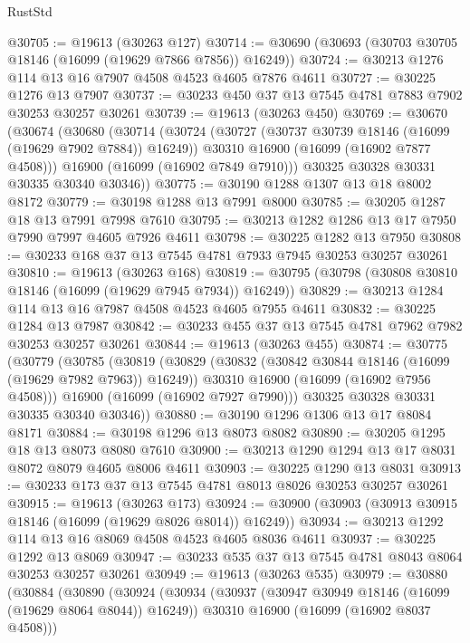 \begin{lexlean}{RustStd}
\begin{coremodule}
@30705 := @19613 (@30263 @127)
@30714 := @30690 (@30693 (@30703 @30705 @18146 (@16099 (@19629 @7866 @7856)) @16249))
@30724 := @30213 @1276 @114 @13 @16 @7907 @4508 @4523 @4605 @7876 @4611
@30727 := @30225 @1276 @13 @7907
@30737 := @30233 @450 @37 @13 @7545 @4781 @7883 @7902 @30253 @30257 @30261
@30739 := @19613 (@30263 @450)
@30769 := @30670
    (@30674
      (@30680
        (@30714
          (@30724
            (@30727 (@30737 @30739 @18146 (@16099 (@19629 @7902 @7884)) @16249))
            @30310
            @16900
            (@16099 (@16902 @7877 @4508)))
          @16900
          (@16099 (@16902 @7849 @7910)))
        @30325
        @30328
        @30331
        @30335
        @30340
        @30346))
@30775 := @30190 @1288 @1307 @13 @18 @8002 @8172
@30779 := @30198 @1288 @13 @7991 @8000
@30785 := @30205 @1287 @18 @13 @7991 @7998 @7610
@30795 := @30213 @1282 @1286 @13 @17 @7950 @7990 @7997 @4605 @7926 @4611
@30798 := @30225 @1282 @13 @7950
@30808 := @30233 @168 @37 @13 @7545 @4781 @7933 @7945 @30253 @30257 @30261
@30810 := @19613 (@30263 @168)
@30819 := @30795 (@30798 (@30808 @30810 @18146 (@16099 (@19629 @7945 @7934)) @16249))
@30829 := @30213 @1284 @114 @13 @16 @7987 @4508 @4523 @4605 @7955 @4611
@30832 := @30225 @1284 @13 @7987
@30842 := @30233 @455 @37 @13 @7545 @4781 @7962 @7982 @30253 @30257 @30261
@30844 := @19613 (@30263 @455)
@30874 := @30775
    (@30779
      (@30785
        (@30819
          (@30829
            (@30832 (@30842 @30844 @18146 (@16099 (@19629 @7982 @7963)) @16249))
            @30310
            @16900
            (@16099 (@16902 @7956 @4508)))
          @16900
          (@16099 (@16902 @7927 @7990)))
        @30325
        @30328
        @30331
        @30335
        @30340
        @30346))
@30880 := @30190 @1296 @1306 @13 @17 @8084 @8171
@30884 := @30198 @1296 @13 @8073 @8082
@30890 := @30205 @1295 @18 @13 @8073 @8080 @7610
@30900 := @30213 @1290 @1294 @13 @17 @8031 @8072 @8079 @4605 @8006 @4611
@30903 := @30225 @1290 @13 @8031
@30913 := @30233 @173 @37 @13 @7545 @4781 @8013 @8026 @30253 @30257 @30261
@30915 := @19613 (@30263 @173)
@30924 := @30900 (@30903 (@30913 @30915 @18146 (@16099 (@19629 @8026 @8014)) @16249))
@30934 := @30213 @1292 @114 @13 @16 @8069 @4508 @4523 @4605 @8036 @4611
@30937 := @30225 @1292 @13 @8069
@30947 := @30233 @535 @37 @13 @7545 @4781 @8043 @8064 @30253 @30257 @30261
@30949 := @19613 (@30263 @535)
@30979 := @30880
    (@30884
      (@30890
        (@30924
          (@30934
            (@30937 (@30947 @30949 @18146 (@16099 (@19629 @8064 @8044)) @16249))
            @30310
            @16900
            (@16099 (@16902 @8037 @4508)))

\end{coremodule}
\end{lexlean}
